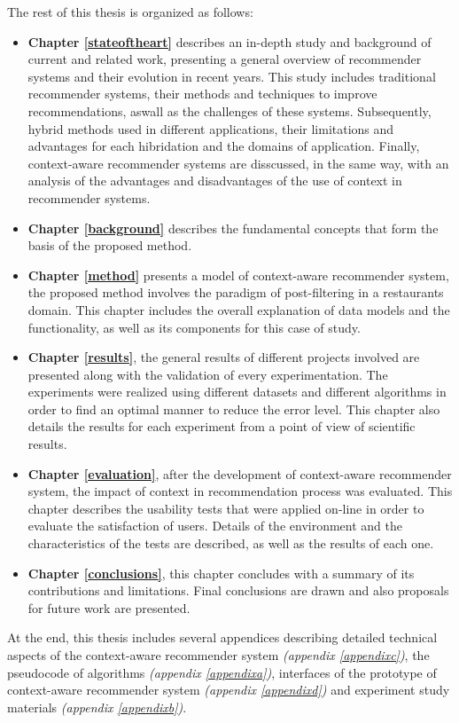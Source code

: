The rest of this thesis is organized as follows: 
\begin{itemize}  
\item \textbf{Chapter \ref{stateoftheart}} describes an in-depth study
and background of current and related work, presenting a general
overview of recommender systems and their evolution in recent years.
This study includes traditional recommender systems, their methods
and techniques to improve recommendations, aswall as the challenges 
of these systems. Subsequently, hybrid methods used in different
applications, their limitations and advantages for each hibridation and
the domains of application. Finally, context-aware recommender systems
are disscussed, in the same way,  with an analysis of the advantages and
disadvantages of the use of context in recommender systems.
\item \textbf{Chapter \ref{background}} describes the fundamental
concepts that form the basis of the proposed method.
\item \textbf{Chapter \ref{method}} presents a model of context-aware
recommender system, the proposed method involves the paradigm of
post-filtering in a restaurants domain. This chapter includes the
overall explanation of data models and  the functionality, as
well as its components for this case of study.
\item \textbf{Chapter \ref{results}}, the general results of different
projects involved are presented along with the validation of every
experimentation. The experiments were realized using different
datasets and different algorithms in order to find an optimal manner
to reduce the error level. This chapter also details the results for
each experiment from a point of view of scientific results.
\item \textbf{Chapter \ref{evaluation}}, after the development of
context-aware recommender system, the impact of
context in recommendation process was evaluated. This chapter describes the
usability tests that were applied on-line in order to evaluate the
satisfaction of users. Details of the environment and the
characteristics of the tests are described, as well as the results of
each one.
\item \textbf{Chapter \ref{conclusions}}, this chapter concludes with a
summary of its contributions and limitations. Final
conclusions are drawn and also proposals for future work are presented.
\end{itemize}  

At the end, this thesis includes several appendices describing
detailed technical aspects of the context-aware recommender system
\textit{(appendix \ref{appendixc})}, the pseudocode of algorithms
\textit{(appendix \ref{appendixa})}, interfaces of the prototype of
context-aware recommender system \textit{(appendix \ref{appendixd})}
and experiment study materials \textit{(appendix \ref{appendixb})}.
